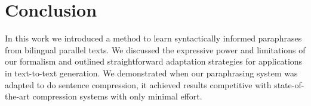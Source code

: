 \documentclass[11pt]{article}
\begin{document}
\section{Conclusion}
\label{sec-conclusion}

In this work we introduced a method to learn syntactically informed
paraphrases from bilingual parallel texts. We discussed the expressive
power and limitations of our formalism and outlined straightforward
adaptation strategies for applications in text-to-text generation. We
demonstrated when our paraphrasing system was adapted to do sentence
compression, it achieved results competitive with state-of-the-art
compression systems with only minimal effort.




\end{document}
